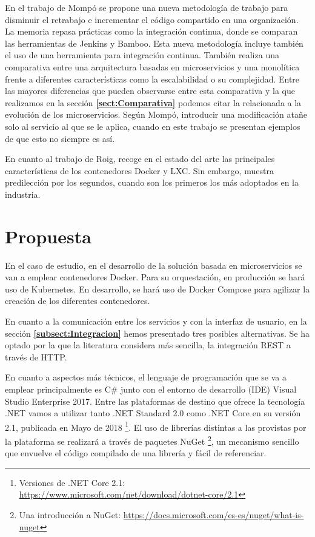 \documentclass[11pt,spanish,listoffigures]{tfgetsinf}
\begin{document}
En el trabajo de Mompó se propone una nueva metodología de trabajo para disminuir el retrabajo e incrementar el código compartido en una organización. La memoria repasa prácticas como la integración continua, donde se comparan las herramientas de Jenkins y Bamboo. Esta nueva metodología incluye también el uso de una herramienta para integración continua. También realiza una comparativa entre una arquitectura basadas en microservicios y una monolítica frente a diferentes características como la escalabilidad o su complejidad. Entre las mayores diferencias que pueden observarse entre esta comparativa y la que realizamos en la sección \textbf{\ref{sect:Comparativa} } podemos citar la relacionada a la evolución de los microservicios. Según Mompó, introducir una modificación atañe solo al servicio al que se le aplica, cuando en este trabajo se presentan ejemplos de que esto no siempre es así.

En cuanto al trabajo de Roig, recoge en el estado del arte las principales características de los contenedores Docker y LXC. Sin embargo, muestra predilección por los segundos, cuando son los primeros los más adoptados en la industria.

\section{Propuesta} \label{sect:Propuesta}

En el caso de estudio, en el desarrollo de la solución basada en microservicios se van a emplear contenedores Docker. Para su orquestación, en producción se hará uso de Kubernetes. En desarrollo, se hará uso de Docker Compose para agilizar la creación de los diferentes contenedores. 

En cuanto a la comunicación entre los servicios y con la interfaz de usuario, en la sección \textbf{\ref{subsect:Integracion} } hemos presentado tres posibles alternativas. Se ha optado por la que la literatura considera más sencilla, la integración REST a través de HTTP.

En cuanto a aspectos más técnicos, el lenguaje de programación que se va a emplear principalmente es C\# junto con el entorno de desarrollo (IDE) Visual Studio Enterprise 2017. Entre las plataformas de destino que ofrece la tecnología .NET vamos a utilizar tanto .NET Standard 2.0 como .NET Core en su versión 2.1, publicada en Mayo de 2018 \footnote{ Versiones de .NET Core 2.1: \url{https://www.microsoft.com/net/download/dotnet-core/2.1}}. El uso de librerías distintas a las provistas por la plataforma se realizará a través de paquetes NuGet \footnote{ Una introducción a NuGet: \url{https://docs.microsoft.com/es-es/nuget/what-is-nuget}}, un mecanismo sencillo que envuelve el código compilado de una librería y fácil de referenciar.
\end{document}
